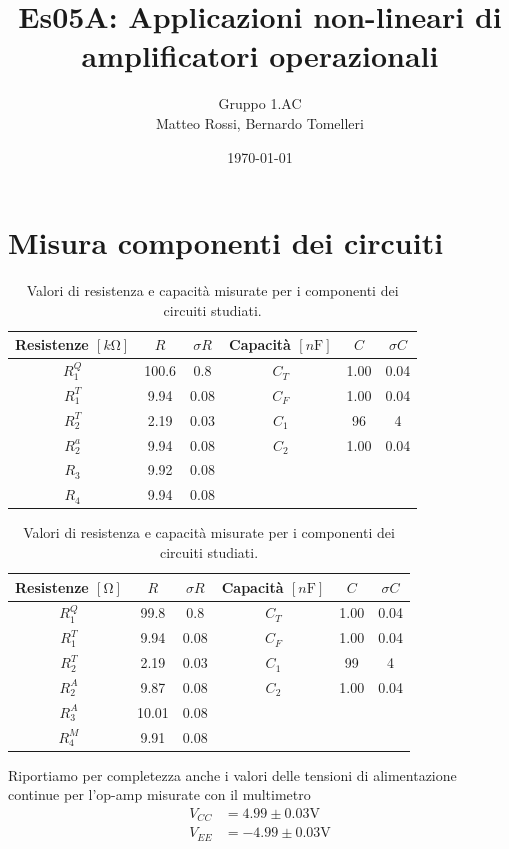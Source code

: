 \documentclass[10pt,a4paper]{article}
\author{Gruppo 1.AC \\ Matteo Rossi, Bernardo Tomelleri}
\title{Es05A: Applicazioni non-lineari di amplificatori operazionali}
\begin{document}
\date{\today}
\maketitle

\setcounter{section}{0}

\section*{Misura componenti dei circuiti}
\begin{table}[htbp]
\centering
\begin{tabular}{cccccc}
\toprule
Resistenze $[\si{k\ohm}]$ & $R$ & $\sigma R$ & Capacità $[\si{n\F}]$ & $C$ &
$\sigma C$ \\
\midrule
\midrule
$R_1^Q$	  & 100.6 	& 0.8 	 & $C_T$ & 1.00		 & 0.04 \\
$R_1^T$	  & 9.94	& 0.08 	 & $C_F$ & 1.00		 & 0.04 \\
$R_2^T$	  & 2.19	& 0.03	 & $C_1$ & 96		 & 4	\\
$R_2^a$	  & 9.94	& 0.08	 & $C_2$ & 1.00		 & 0.04 \\
$R_3$	  & 9.92	& 0.08	 & & & \\
$R_4$	  & 9.94	& 0.08	 & & & \\
\bottomrule     
\end{tabular}
\caption{Valori di resistenza e capacità misurate per i componenti dei
circuiti studiati. \label{tab: rcmes_B}}

\begin{tabular}{cccccc}
\toprule
Resistenze $[\si{\ohm}]$ & $R$ & $\sigma R$ & Capacità $[\si{n\F}]$ & $C$ &
$\sigma C$ \\
\midrule
\midrule
$R_1^Q$	  & 99.8 	& 0.8 	 & $C_T$ & 1.00		 & 0.04 \\
$R_1^T$	  & 9.94	& 0.08 	 & $C_F$ & 1.00		 & 0.04 \\
$R_2^T$	  & 2.19	& 0.03	 & $C_1$ & 99		 & 4	\\
$R_2^A$	  & 9.87		& 0.08		 & $C_2$ & 1.00		 & 0.04 \\
$R_3^A$	  & 10.01		& 0.08		 & & & \\
$R_4^M$	  & 9.91		& 0.08		 & & & \\
\bottomrule     
\end{tabular}
\caption{Valori di resistenza e capacità misurate per i componenti dei
circuiti studiati. \label{tab: rcmes_M}}
\end{table}

Riportiamo per completezza anche i valori delle tensioni di alimentazione
continue per l'op-amp misurate con il multimetro
\begin{align*}
V_{CC} &= 4.99 \pm 0.03 \si{\V} \\
V_{EE} &= -4.99 \pm 0.03 \si{\V}
\end{align*}
\end{document}
